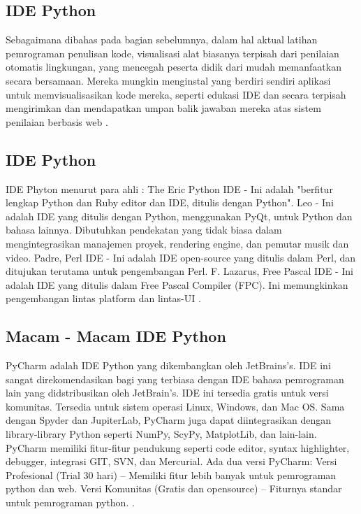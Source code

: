 \subsection{IDE Python}
Sebagaimana dibahas pada bagian sebelumnya, dalam hal aktual latihan pemrograman penulisan kode, visualisasi alat biasanya terpisah dari penilaian otomatis lingkungan, yang mencegah peserta didik dari mudah memanfaatkan secara bersamaan. Mereka mungkin menginstal yang berdiri sendiri aplikasi untuk memvisualisasikan kode mereka, seperti edukasi IDE dan secara terpisah mengirimkan dan mendapatkan umpan balik jawaban mereka atas sistem penilaian berbasis web \cite{helminen2010jype}.

\subsection{IDE Python}
IDE Phyton menurut para ahli :
The Eric Python IDE - Ini adalah "berfitur lengkap Python dan Ruby editor dan IDE, ditulis dengan Python".
Leo - Ini adalah IDE yang ditulis dengan Python, menggunakan PyQt, untuk Python dan bahasa lainnya. Dibutuhkan pendekatan yang tidak biasa dalam mengintegrasikan manajemen proyek, rendering engine, dan pemutar musik dan video.
Padre, Perl IDE - Ini adalah IDE open-source yang ditulis dalam Perl, dan ditujukan terutama untuk pengembangan Perl.
 F. Lazarus, Free Pascal IDE - Ini adalah IDE yang ditulis dalam Free Pascal Compiler (FPC). Ini memungkinkan pengembangan lintas platform dan lintas-UI \cite{swarnkar2013survey}.

\subsection{Macam - Macam IDE Python}
PyCharm adalah IDE Python yang dikembangkan oleh JetBrains’s. IDE ini sangat direkomendasikan bagi yang terbiasa dengan IDE bahasa pemrograman lain yang didstribusikan oleh JetBrain’s. IDE ini tersedia gratis untuk versi komunitas. Tersedia untuk sistem operasi Linux, Windows, dan Mac OS. Sama dengan Spyder dan JupiterLab, PyCharm juga dapat diintegrasikan dengan library-library Python seperti NumPy, ScyPy, MatplotLib, dan lain-lain. PyCharm memiliki fitur-fitur pendukung seperti code editor, syntax highlighter, debugger, integrasi GIT, SVN, dan Mercurial.
Ada dua versi PyCharm:
Versi Profesional (Trial 30 hari) – Memiliki fitur lebih banyak untuk pemrograman python dan web.
Versi Komunitas (Gratis dan opensource) – Fiturnya standar untuk pemrograman python. 
\cite{tateosian2015beginning}.

